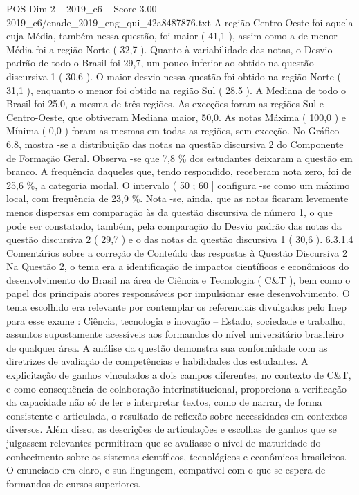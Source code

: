 \begin{textsample}{POS Dim 2 – 2019\_c6 – Score 3.00 – 2019\_c6/enade\_2019\_eng\_qui\_42a8487876.txt}
A região Centro-Oeste foi aquela cuja Média, também nessa questão, foi maior ( 41,1 ), assim como a de menor Média foi a região Norte ( 32,7 ).
Quanto à variabilidade das notas, o Desvio padrão de todo o Brasil foi 29,7, um pouco inferior ao obtido na questão discursiva 1 ( 30,6 ).
O maior desvio nessa questão foi obtido na região Norte ( 31,1 ), enquanto o menor foi obtido na região Sul ( 28,5 ).
A Mediana de todo o Brasil foi 25,0, a mesma de três regiões.
As exceções foram as regiões Sul e Centro-Oeste, que obtiveram Mediana maior, 50,0.
As notas Máxima ( 100,0 ) e Mínima ( 0,0 ) foram as mesmas em todas as regiões, sem exceção.
No Gráfico 6.8, mostra -se a distribuição das notas na questão discursiva 2 do Componente de Formação Geral.
Observa -se que 7,8 \% dos estudantes deixaram a questão em branco.
A frequência daqueles que, tendo respondido, receberam nota zero, foi de 25,6 \%, a categoria modal.
O intervalo ( 50 ; 60 ] configura -se como um máximo local, com frequência de 23,9 \%.
Nota -se, ainda, que as notas ficaram levemente menos dispersas em comparação às da questão discursiva de número 1, o que pode ser constatado, também, pela comparação do Desvio padrão das notas da questão discursiva 2 ( 29,7 ) e o das notas da questão discursiva 1 ( 30,6 ). 6.3.1.4 Comentários sobre a correção de Conteúdo das respostas à Questão Discursiva 2 Na Questão 2, o tema era a identificação de impactos científicos e econômicos do desenvolvimento do Brasil na área de Ciência e Tecnologia ( C\&T ), bem como o papel dos principais atores responsáveis por impulsionar esse desenvolvimento.
O tema escolhido era relevante por contemplar os referenciais divulgados pelo Inep para esse exame : Ciência, tecnologia e inovação – Estado, sociedade e trabalho, assuntos supostamente acessíveis aos formandos do nível universitário brasileiro de qualquer área.
A análise da questão demonstra sua conformidade com as diretrizes de avaliação de competências e habilidades dos estudantes.
A explicitação de ganhos vinculados a dois campos diferentes, no contexto de C\&T, e como consequência de colaboração interinstitucional, proporciona a verificação da capacidade não só de ler e interpretar textos, como de narrar, de forma consistente e articulada, o resultado de reflexão sobre necessidades em contextos diversos.
Além disso, as descrições de articulações e escolhas de ganhos que se julgassem relevantes permitiram que se avaliasse o nível de maturidade do conhecimento sobre os sistemas científicos, tecnológicos e econômicos brasileiros.
O enunciado era claro, e sua linguagem, compatível com o que se espera de formandos de cursos superiores.

\end{textsample}
